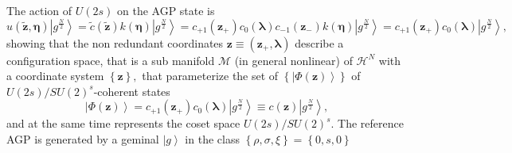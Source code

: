 \documentclass[aps,preprint]{revtex4}%
\begin{document}
The action of $U\left(  2s\right)  $ on the AGP state is
\begin{equation}
u\left(  \mathbf{\tilde{z},\eta}\right)  \left\vert g^{\frac{N}{2}%
}\right\rangle =\tilde{c}\left(  \mathbf{\tilde{z}}\right)  k\left(
\mathbf{\eta}\right)  \left\vert g^{\frac{N}{2}}\right\rangle =c_{+1}\left(
\mathbf{z}_{+}\right)  c_{0}\left(  \mathbf{\lambda}\right)  c_{-1}\left(
\mathbf{z}_{-}\right)  k\left(  \mathbf{\eta}\right)  \left\vert g^{\frac
{N}{2}}\right\rangle =c_{+1}\left(  \mathbf{z}_{+}\right)  c_{0}\left(
\mathbf{\lambda}\right)  \left\vert g^{\frac{N}{2}}\right\rangle ,
\end{equation}
showing that the non redundant coordinates $\mathbf{z}\equiv\left(
\mathbf{z}_{+},\mathbf{\lambda}\right)  $ describe a configuration space, that
is a sub manifold $\mathcal{M}$ (in general nonlinear) of $\mathcal{H}^{N}$
with a coordinate system $\left\{  \mathbf{z}\right\}  ,$ that parameterize
the set of $\left\{  \left\vert \Phi\left(  \mathbf{z}\right)  \right\rangle
\right\}  $ of $U\left(  2s\right)  /SU\left(  2\right)  ^{s}$-coherent
states
\begin{equation}
\left\vert \Phi\left(  \mathbf{z}\right)  \right\rangle =c_{+1}\left(
\mathbf{z}_{+}\right)  c_{0}\left(  \mathbf{\lambda}\right)  \left\vert
g^{\frac{N}{2}}\right\rangle \equiv c\left(  \mathbf{z}\right)  \left\vert
g^{\frac{N}{2}}\right\rangle ,
\end{equation}
and at the same time represents the coset space $U\left(  2s\right)
/SU\left(  2\right)  ^{s}$. The reference AGP is generated by a geminal
$\left\vert g\right\rangle $ in the class $\left\{  \rho,\sigma,\xi\right\}
=\left\{  0,s,0\right\}  $
\end{document}
